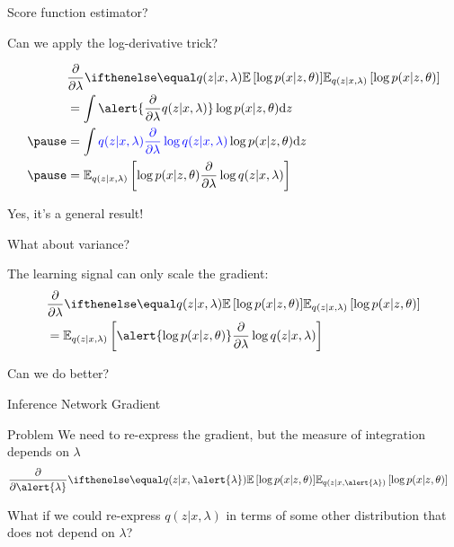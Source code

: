 \begin{frame}{Score function estimator?}

	Can we apply the log-derivative trick? 
	\vspace{-10pt}
	
	\begin{equation*}
	\begin{aligned}
	&\pdv{\lambda}\E[q(z|x,\lambda)]{\log p(x|z,\theta)} \\
	&= \int \alert{\pdv{\lambda} q(z|x,\lambda)}\log p(x|z,\theta) \dd z \\ \pause
	&= \int \textcolor{blue}{q(z|x,\lambda) \pdv{\lambda} \log q(z|x,\lambda)}\log p(x|z,\theta) \dd z \\ \pause
	&= \mathbb E_{q(z|x,\lambda)}\left[ \log p(x|z,\theta) \pdv{\lambda} \log q(z|x,\lambda)  \right]
	\end{aligned}
	\end{equation*}
	
	Yes, it's a general result!

\end{frame}

\begin{frame}{What about variance?}

	The learning signal can only scale the gradient:
	\begin{equation*}
	\begin{aligned}
	&\pdv{\lambda}\E[q(z|x,\lambda)]{\log p(x|z,\theta)} \\
	&= \mathbb E_{q(z|x,\lambda)}\left[ \alert{\log p(x|z,\theta)} \pdv{\lambda} \log q(z|x,\lambda)  \right]
	\end{aligned}
	\end{equation*}
	
	\pause
	
	Can we do better? 
	
\end{frame}
\begin{frame}{Inference Network Gradient}
\begin{block}{Problem}
We need to re-express the gradient, but the measure of integration depends on $\lambda$
	\begin{equation*}
	\begin{aligned}
	&\pdv{\alert{\lambda}}\E[q(z|x,\alert{\lambda})]{\log p(x|z,\theta)}
	\end{aligned}
	\end{equation*}
	
	\pause
	
	What if we could re-express $q(z|x, \lambda)$ in terms of some other distribution that does not depend on $\lambda$?

\end{block}
\end{frame}


